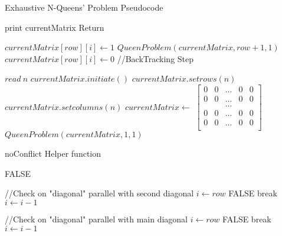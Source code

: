 \begin{algorithm}[H]
\caption{Exhaustive N-Queens’ Problem Pseudocode}
\begin{algorithmic}[1]
	\State print currentMatrix
	\State Return

\EndIf
{}
		\State $currentMatrix[row][i] \gets 1$
		\State $QueenProblem(currentMatrix,row+1,1)$
		\State $currentMatrix[row][i] \gets 0$
		//BackTracking Step
	\EndIf
\EndFor
\EndProcedure
{}

\State $read\ n$
\State $currentMatrix.initiate()$
\State $currentMatrix.setrows(n)$
\State $currentMatrix.setcolumns(n)$
\State $currentMatrix \gets$
$\left[\begin{array}{ccccc}
0 & 0 & ... & 0 & 0	\\
0 & 0 & ... & 0 & 0	\\
 &  & ... &  & 	\\
0 & 0 & ... & 0 & 0	\\
0 & 0 & ... & 0 & 0	\\
\end{array}\right]$ 
\State $QueenProblem(currentMatrix,1,1)$
\EndProcedure
\end{algorithmic}
\end{algorithm}

\begin{algorithm}[H]
\caption{noConflict Helper function}
\begin{algorithmic}[1]
			\State \Return FALSE
		\EndIf
	\EndFor
	
	
	//Check on "diagonal" parallel with second diagonal
	\State $i \gets row$
			\State \Return FALSE
		\EndIf
		\State break
	\EndIf
	\State $i \gets i-1$	
	\EndFor
	
	//Check on "diagonal" parallel with main diagonal
	\State $i \gets row$
			\State \Return FALSE
		\EndIf
		\State break
	\EndIf
	\State $i \gets i-1$	
	\EndFor

\EndProcedure

\end{algorithmic}
\end{algorithm}

